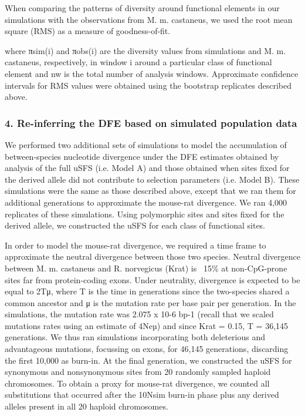 When comparing the patterns of diversity around functional elements in our simulations with the observations from M. m. castaneus, we used the root mean square (RMS) as a measure of goodness-of-fit. 

where πsim(i) and πobs(i) are the diversity values from simulations and M. m. castaneus, respectively, in window i around a particular class of functional element and nw is the total number of analysis windows. Approximate confidence intervals for RMS values were obtained using the bootstrap replicates described above.

\subsubsection{4. Re-inferring the DFE based on simulated population data}

We performed two additional sets of simulations to model the accumulation of between-species nucleotide divergence under the DFE estimates obtained by analysis of the full uSFS (i.e. Model A) and those obtained when sites fixed for the derived allele did not contribute to selection parameters (i.e. Model B). These simulations were the same as those described above, except that we ran them for additional generations to approximate the mouse-rat divergence. We ran 4,000 replicates of these simulations. Using polymorphic sites and sites fixed for the derived allele, we constructed the uSFS for each class of functional sites. 

In order to model the mouse-rat divergence, we required a time frame to approximate the neutral divergence between those two species. Neutral divergence between M. m. castaneus and R. norvegicus (Krat) is ~15\% at non-CpG-prone sites far from protein-coding exons. Under neutrality, divergence is expected to be equal to 2Tμ, where T is the time in generations since the two-species shared a common ancestor and μ is the mutation rate per base pair per generation. In the simulations, the mutation rate was 2.075 x 10-6 bp-1 (recall that we scaled mutations rates using an estimate of 4Neµ) and since Krat = 0.15, T = 36,145 generations. We thus ran simulations incorporating both deleterious and advantageous mutations, focussing on exons, for 46,145 generations, discarding the first 10,000 as burn-in. At the final generation, we constructed the uSFS for synonymous and nonsynonymous sites from 20 randomly sampled haploid chromosomes. To obtain a proxy for mouse-rat divergence, we counted all substitutions that occurred after the 10Nsim burn-in phase plus any derived alleles present in all 20 haploid chromosomes.

